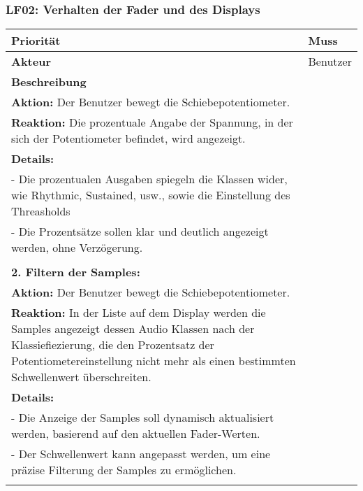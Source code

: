 \subsubsection{LF02: Verhalten der Fader und des Displays}
	\hypertarget{LF02_Link}{}
\begin{longtable}[c]{|p{3cm}|p{13cm}|}
	\hline
	\textbf{Priorität} & Muss \\
	\hline
	\textbf{Akteur} & Benutzer \\
	\hline
	\textbf{Beschreibung} & 
	\begin{tabularx}{13cm}{X}
		\textbf{1. Anzeige der Fader-Werte:} \\
		\textbf{Aktion:} Der Benutzer bewegt die Schiebepotentiometer. \\
		\textbf{Reaktion:} Die prozentuale Angabe der Spannung, in der sich der Potentiometer befindet, wird angezeigt. \\
		\textbf{Details:} \\
		- Die prozentualen Ausgaben spiegeln die Klassen wider, wie Rhythmic, Sustained, usw., sowie die Einstellung des Threasholds \\
		- Die Prozentsätze sollen klar und deutlich angezeigt werden, ohne Verzögerung. \\
		\\
		\textbf{2. Filtern der Samples:} \\
		\textbf{Aktion:} Der Benutzer bewegt die Schiebepotentiometer. \\
		\textbf{Reaktion:} In der Liste auf dem Display werden die Samples angezeigt dessen Audio Klassen nach der Klassiefiezierung, die den Prozentsatz der Potentiometereinstellung nicht mehr als einen bestimmten Schwellenwert überschreiten. \\
		\textbf{Details:} \\
		- Die Anzeige der Samples soll dynamisch aktualisiert werden, basierend auf den aktuellen Fader-Werten. \\
		- Der Schwellenwert kann angepasst werden, um eine präzise Filterung der Samples zu ermöglichen. \\
	\end{tabularx} \\
	\hline
\end{longtable}